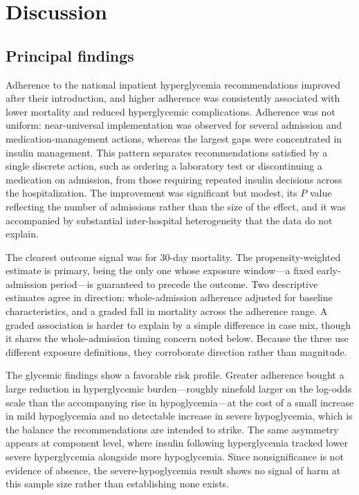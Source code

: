 \section{Discussion}
\label{sec:discussion}

\subsection{Principal findings}

Adherence to the national inpatient hyperglycemia recommendations improved
after their introduction, and higher adherence was consistently associated with
lower mortality and reduced hyperglycemic complications. Adherence was not
uniform: near-universal implementation was observed for several admission and
medication-management actions, whereas the largest gaps were concentrated in
insulin management. This pattern separates recommendations satisfied by a single
discrete action, such as ordering a laboratory test or discontinuing a
medication on admission, from those requiring repeated insulin decisions
across the hospitalization. The improvement was significant but modest, its $P$
value reflecting the number of admissions rather than the size of the effect,
and it was accompanied by substantial inter-hospital heterogeneity that the data
do not explain.

The clearest outcome signal was for 30-day mortality. The propensity-weighted
estimate is primary, being the only one whose exposure window---a fixed
early-admission period---is guaranteed to precede the outcome. Two descriptive
estimates agree in direction: whole-admission adherence adjusted for baseline
characteristics, and a graded fall in mortality across the adherence range. A
graded association is harder to explain by a simple difference in case mix,
though it shares the whole-admission timing concern noted below. Because the
three use different exposure definitions, they corroborate direction rather
than magnitude.

The glycemic findings show a favorable risk profile. Greater adherence bought a
large reduction in hyperglycemic burden---roughly ninefold larger on the
log-odds scale than the accompanying rise in hypoglycemia---at the cost of a
small increase in mild hypoglycemia and no detectable increase in severe
hypoglycemia, which is the balance the recommendations are intended to strike.
The same asymmetry appears at component level, where insulin following
hyperglycemia tracked lower severe hyperglycemia alongside more hypoglycemia.
Since nonsignificance is not evidence of absence, the severe-hypoglycemia
result shows no signal of harm at this sample size rather than establishing
none exists.

